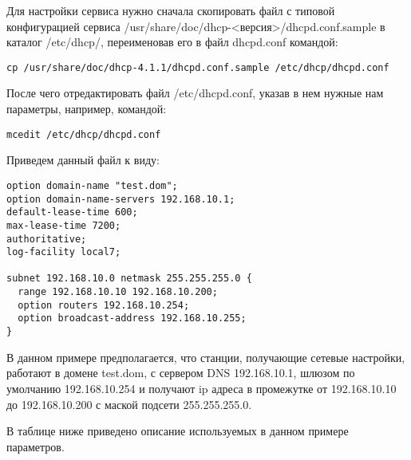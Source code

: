 \documentclass[a4paper,10pt,twoside]{article}
\begin{document}
Для настройки сервиса нужно сначала скопировать файл с типовой конфигурацией сервиса 
/usr/share/doc/dhcp-<версия>/dhcpd.conf.sample                                                                                                                    в каталог /etc/dhcp/, переименовав его в файл dhcpd.conf командой:

\begin{verbatim}
cp /usr/share/doc/dhcp-4.1.1/dhcpd.conf.sample /etc/dhcp/dhcpd.conf
\end{verbatim} 

После чего отредактировать файл /etc/dhcpd.conf, указав в нем нужные нам параметры, например, командой:

\begin{verbatim}
mcedit /etc/dhcp/dhcpd.conf
\end{verbatim} 

Приведем данный файл к виду:

\begin{verbatim}
option domain-name "test.dom";
option domain-name-servers 192.168.10.1;
default-lease-time 600;
max-lease-time 7200;
authoritative;
log-facility local7;

subnet 192.168.10.0 netmask 255.255.255.0 {
  range 192.168.10.10 192.168.10.200;
  option routers 192.168.10.254;
  option broadcast-address 192.168.10.255;
} 
\end{verbatim}

В данном примере предполагается, что станции, получающие сетевые настройки, работают в домене test.dom, с сервером DNS 192.168.10.1, шлюзом по умолчанию 192.168.10.254 и получают ip адреса в промежутке от 192.168.10.10 до 192.168.10.200 с маской подсети 255.255.255.0.

В таблице ниже приведено описание используемых в данном примере параметров.
\end{document}
